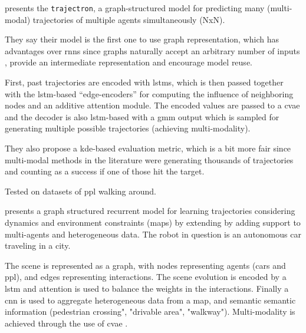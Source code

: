 


\cite{ivanovic2019trajectron} presents the \texttt{trajectron}, a graph-structured model for predicting many (multi-modal) trajectories of multiple agents simultaneously (NxN).

They say their model is the first one to use graph representation, which has advantages over \glspl{rnn} since graphs naturally accept an arbitrary number of inputs , provide an intermediate representation and encourage model reuse.

First, past trajectories are encoded with \glspl{lstm}, which is then passed together with the \gls{lstm}-based ``edge-encoders'' for computing the influence of neighboring nodes and an additive attention module. 
%
The encoded values are passed to a \gls{cvae} and the decoder is also \gls{lstm}-based with a \gls{gmm} output which is sampled for generating multiple possible trajectories (achieving multi-modality).

They also propose a \gls{kde}-based evaluation metric, which is a bit more fair since multi-modal methods in the literature were generating thousands of trajectories and counting as a success if one of those hit the target.

Tested on datasets of ppl walking around.


\cite{salzmann2020trajectron++}  presents a graph structured recurrent model for learning trajectories considering dynamics and environment constraints (maps) by extending \cite{ivanovic2019trajectron} by adding support to multi-agents and heterogeneous data. The robot in question is an autonomous car traveling in a city.

The scene is represented as a graph, with nodes representing agents (cars and ppl), and edges representing interactions.
%
The scene evolution is encoded by a \gls{lstm} and attention is used to balance the weights in the interactions.
%
Finally a \gls{cnn} is used to aggregate heterogeneous data from a map, and semantic semantic information (pedestrian crossing", "drivable area", "walkway"). 
%
Multi-modality is achieved through the use of \gls{cvae} .


